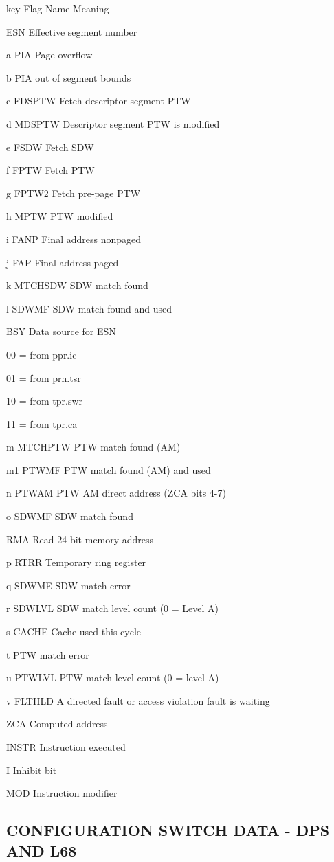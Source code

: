 key Flag Name Meaning

ESN Effective segment number

a PIA Page overflow

b PIA out of segment bounds

c FDSPTW Fetch descriptor segment PTW

d MDSPTW Descriptor segment PTW is modified

e FSDW Fetch SDW

f FPTW Fetch PTW

g FPTW2 Fetch pre-page PTW

h MPTW PTW modified

i FANP Final address nonpaged

j FAP Final address paged

k MTCHSDW SDW match found

l SDWMF SDW match found and used

BSY Data source for ESN

00 = from ppr.ic

01 = from prn.tsr

10 = from tpr.swr

11 = from tpr.ca

m MTCHPTW PTW match found (AM)

m1 PTWMF PTW match found (AM) and used

n PTWAM PTW AM direct address (ZCA bits 4-7)

o SDWMF SDW match found

RMA Read 24 bit memory address

p RTRR Temporary ring register

q SDWME SDW match error

r SDWLVL SDW match level count (0 = Level A)

s CACHE Cache used this cycle

t PTW match error

u PTWLVL PTW match level count (0 = level A)

v FLTHLD A directed fault or access violation fault is waiting

ZCA Computed address

INSTR Instruction executed

I Inhibit bit

MOD Instruction modifier

\subsection{CONFIGURATION SWITCH DATA - DPS AND L68}

